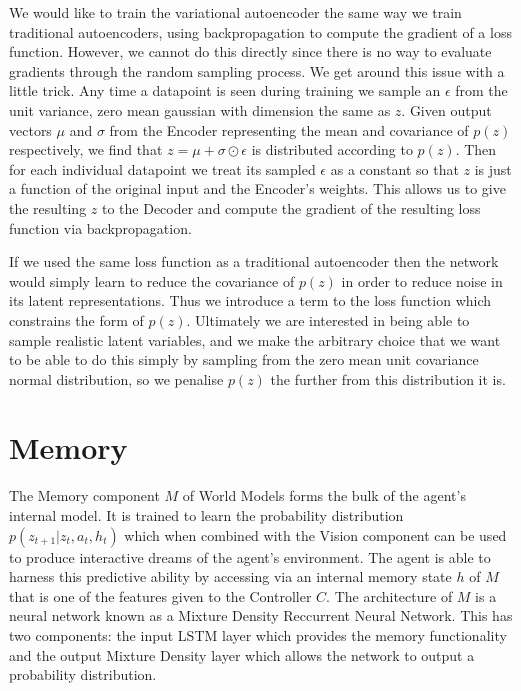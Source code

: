 \documentclass{article}
\theoremstyle{definition}
\begin{document}
We would like to train the variational autoencoder the same way we train traditional autoencoders, using backpropagation to compute the gradient of a loss function.
However, we cannot do this directly since there is no way to evaluate gradients through the random sampling process.
We get around this issue with a little trick.
Any time a datapoint is seen during training we sample an $\epsilon$ from the unit variance, zero mean gaussian with dimension the same as $z$.
Given output vectors $\mu$ and $\sigma$ from the Encoder representing the mean and covariance of $p(z)$ respectively, we find that $z = \mu + \sigma \odot \epsilon$ is distributed according to $p(z)$.
Then for each individual datapoint we treat its sampled $\epsilon$ as a constant so that $z$ is just a function of the original input and the Encoder's weights.
This allows us to give the resulting $z$ to the Decoder and compute the gradient of the resulting loss function via backpropagation.

If we used the same loss function as a traditional autoencoder then the network would simply learn to reduce the covariance of $p(z)$ in order to reduce noise in its latent representations.
Thus we introduce a term to the loss function which constrains the form of $p(z)$.
Ultimately we are interested in being able to sample realistic latent variables, and we make the arbitrary choice that we want to be able to do this simply by sampling from the zero mean unit covariance normal distribution, so we penalise $p(z)$ the further from this distribution it is.

\section{Memory}
The Memory component $M$ of World Models forms the bulk of the agent's internal model.
It is trained to learn the probability distribution $p(z_{t+1} | z_t, a_t, h_t)$ which when combined with the Vision component can be used to produce interactive dreams of the agent's environment.
The agent is able to harness this predictive ability by accessing via an internal memory state $h$ of $M$ that is one of the features given to the Controller $C$.
The architecture of $M$ is a neural network known as a Mixture Density Reccurrent Neural Network.
This has two components: the input LSTM layer which provides the memory functionality and the output Mixture Density layer which allows the network to output a probability distribution. 
\end{document}
